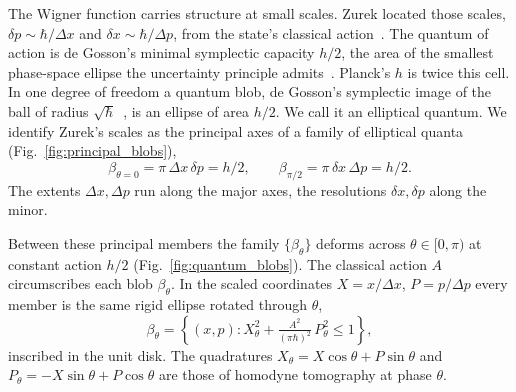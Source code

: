 \documentclass[aps,prl,reprint,amsmath,amssymb,floatfix,nofootinbib]{revtex4-2}
\begin{document}
The Wigner function carries structure at small scales. Zurek located those scales, $\delta p \sim \hbar/\Delta x$ and $\delta x \sim \hbar/\Delta p$, from the state's classical action~\cite{zurek2001}. The quantum of action is de Gosson's minimal symplectic capacity $h/2$, the area of the smallest phase-space ellipse the uncertainty principle admits~\cite{degosson2003quantization,degosson2013qblobs}. Planck's $h$ is twice this cell. In one degree of freedom a quantum blob, de Gosson's symplectic image of the ball of radius $\sqrt{\hbar}$~\cite{degosson2013qblobs}, is an ellipse of area $h/2$. We call it an elliptical quantum. We identify Zurek's scales as the principal axes of a family of elliptical quanta (Fig.~\ref{fig:principal_blobs}),
\begin{equation}
\beta_{\theta=0} = \pi\,\Delta x\,\delta p = h/2, \qquad \beta_{\pi/2} = \pi\,\delta x\,\Delta p = h/2.
\label{eq:principal_axis_blobs}
\end{equation}
The extents $\Delta x, \Delta p$ run along the major axes, the resolutions $\delta x, \delta p$ along the minor.

Between these principal members the family $\{\beta_\theta\}$ deforms across $\theta \in [0,\pi)$ at constant action $h/2$ (Fig.~\ref{fig:quantum_blobs}). The classical action $A$ circumscribes each blob $\beta_\theta$. In the scaled coordinates $X = x/\Delta x$, $P = p/\Delta p$ every member is the same rigid ellipse rotated through $\theta$,
\begin{equation}
\beta_\theta = \left\{ (x,p) : X_\theta^{2} + \tfrac{A^2}{(\pi\hbar)^2}\, P_\theta^{2} \le 1 \right\},
\label{eq:atheta}
\end{equation}
inscribed in the unit disk. The quadratures $X_\theta = X\cos\theta + P\sin\theta$ and $P_\theta = -X\sin\theta + P\cos\theta$ are those of homodyne tomography at phase $\theta$.
\end{document}
